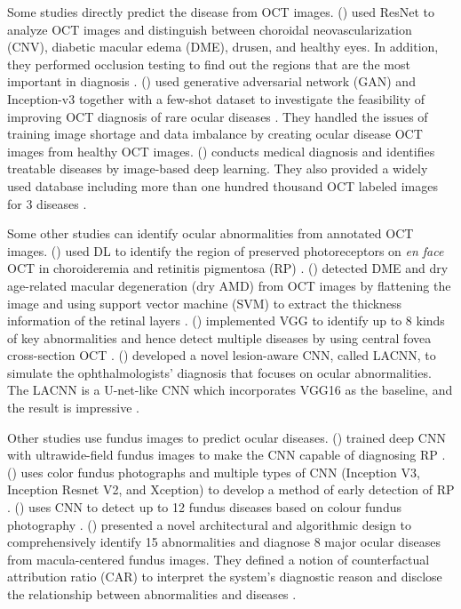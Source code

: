 \documentclass{article}
\newcommand{\authyear}[1]{\citeauthor{#1} (\citeyear{#1})}
\begin{document}
	Some studies directly predict the disease from OCT images.
	\authyear{li2019deep} used ResNet to analyze OCT images and distinguish between choroidal neovascularization (CNV), diabetic macular edema (DME), drusen, and healthy eyes. In addition, they performed occlusion testing to find out the regions that are the most important in diagnosis \autocite{li2019deep}. 
	\authyear{yoo2021feasibility} used generative adversarial network (GAN) and Inception-v3 together with a few-shot dataset to investigate the feasibility of improving OCT diagnosis of rare ocular diseases \autocite{yoo2021feasibility}. They handled the issues of training image shortage and data imbalance by creating ocular disease OCT images from healthy OCT images. \authyear{Kermany2018} conducts medical diagnosis and identifies treatable diseases by image-based deep learning. They also provided a widely used database including more than one hundred thousand OCT labeled images for 3 diseases \autocite{Kermany2018}.
	
	Some other studies can identify ocular abnormalities from annotated OCT images.
	\authyear{camino2018deep} used DL to identify the region of preserved photoreceptors on \textit{en face} OCT in choroideremia and retinitis pigmentosa (RP) \autocite{camino2018deep}. 
	\authyear{srinivasan2014fully} detected DME and dry age-related macular degeneration (dry AMD) from OCT images by flattening the image and using support vector machine (SVM) to extract the thickness information of the retinal layers \autocite{srinivasan2014fully}. 
	\authyear{leandro2023oct} implemented VGG to identify up to 8 kinds of key abnormalities and hence detect multiple diseases by using central fovea cross-section OCT \autocite{leandro2023oct}. \authyear{Fang_Wang2019} developed a novel lesion-aware CNN, called LACNN, to simulate the ophthalmologists' diagnosis that focuses on ocular abnormalities. The LACNN is a U-net-like CNN which incorporates VGG16 as the baseline, and the result is impressive \autocite{Fang_Wang2019}.
	
	Other studies use fundus images to predict ocular diseases.
	\authyear{masumoto2019accuracy} trained deep CNN with ultrawide-field fundus images to make the CNN capable of diagnosing RP \autocite{masumoto2019accuracy}. 
	\authyear{chen2021artificial} uses color fundus photographs and multiple types of CNN (Inception V3, Inception Resnet V2, and Xception) to develop a method of early detection of RP \autocite{chen2021artificial}. 
	\authyear{li2022development} uses CNN to detect up to 12 fundus diseases based on colour fundus photography \autocite{li2022development}. \authyear{Son2023} presented a novel architectural and algorithmic design to comprehensively identify 15 abnormalities and diagnose 8 major ocular diseases from macula-centered fundus images. They defined a notion of counterfactual attribution ratio (CAR) to interpret the system's diagnostic reason and disclose the relationship between abnormalities and diseases \autocite{Son2023}.
	
\end{document}
